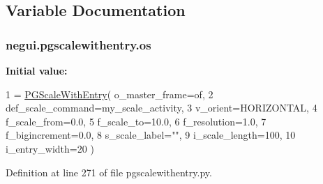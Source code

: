 \subsection{Variable Documentation}
\subsubsection[{\texorpdfstring{os}{os}}]{\setlength{\rightskip}{0pt plus 5cm}negui.\+pgscalewithentry.\+os}\hypertarget{namespacenegui_1_1pgscalewithentry_a58dae139d8302b241a8a5e9dd6e366ee}{}\label{namespacenegui_1_1pgscalewithentry_a58dae139d8302b241a8a5e9dd6e366ee}
{\bfseries Initial value\+:}
\begin{DoxyCode}
1 = \hyperlink{classnegui_1_1pgscalewithentry_1_1PGScaleWithEntry}{PGScaleWithEntry}( o\_master\_frame=of,
2                 def\_scale\_command=my\_scale\_activity,
3                 v\_orient=HORIZONTAL,
4                 f\_scale\_from=0.0,
5                 f\_scale\_to=10.0,
6                 f\_resolution=1.0,
7                 f\_bigincrement=0.0,
8                 s\_scale\_label=\textcolor{stringliteral}{""},
9                 i\_scale\_length=100,
10                 i\_entry\_width=20  )
\end{DoxyCode}


Definition at line 271 of file pgscalewithentry.\+py.

